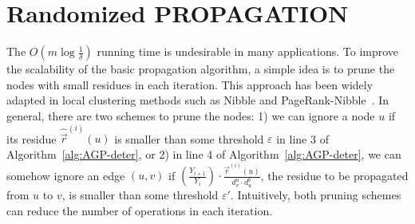 \section{Randomized PROPAGATION}
\label{sec:RPA}



The $O\left(m \log \frac{1}{\delta}\right)$ running time is undesirable in many applications. To improve the scalability of the basic propagation algorithm, a simple idea is to prune the nodes with small residues in each iteration. This approach has been widely adapted in local clustering methods such as Nibble and PageRank-Nibble~\cite{FOCS06_FS}. In general, there are two schemes to prune the nodes: 1) we can ignore a node $u$ if its  residue $\hat{\vec{r}}^{(i)}(u)$ is smaller than some threshold $\varepsilon$ in line 3 of Algorithm~\ref{alg:AGP-deter}, or 2) in line 4 of Algorithm~\ref{alg:AGP-deter}, we can somehow ignore an edge $(u,v)$ if $\left(\frac{Y_{i+1}}{Y_i} \right) \cdot \frac{\vec{r}^{(i)}(u)}{d_v^{a} \cdot d_u^b}$, the  residue to be propagated from  
$u$ to $v$, is smaller than some  threshold $\varepsilon'$.  Intuitively, both pruning schemes can reduce the number of operations in each iteration.



